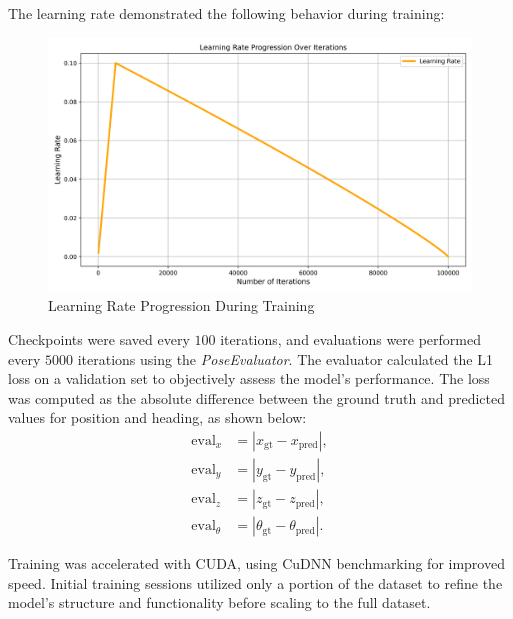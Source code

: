 The learning rate demonstrated the following behavior during training:
\begin{figure}[H]
    \centering
    \includegraphics[width=0.75\linewidth]{LateX//figs/learning_rate_progression.png}
    \caption{Learning Rate Progression During Training}
    \label{fig:learning-rate-progression}
\end{figure}

Checkpoints were saved every $100$ iterations, and evaluations were performed every $5000$ iterations using the \textit{PoseEvaluator}. The evaluator calculated the L1 loss on a validation set to objectively assess the model’s performance. The loss was computed as the absolute difference between the ground truth and predicted values for position and heading, as shown below:
\begin{align}
    \text{eval}_x &= |x_{\text{gt}} - x_{\text{pred}}|, \\
    \text{eval}_y &= |y_{\text{gt}} - y_{\text{pred}}|, \\
    \text{eval}_z &= |z_{\text{gt}} - z_{\text{pred}}|, \\
    \text{eval}_{\theta} &= |\theta_{\text{gt}} - \theta_{\text{pred}}|.
\end{align}

Training was accelerated with CUDA, using CuDNN benchmarking for improved speed. Initial training sessions utilized only a portion of the dataset to refine the model’s structure and functionality before scaling to the full dataset.

